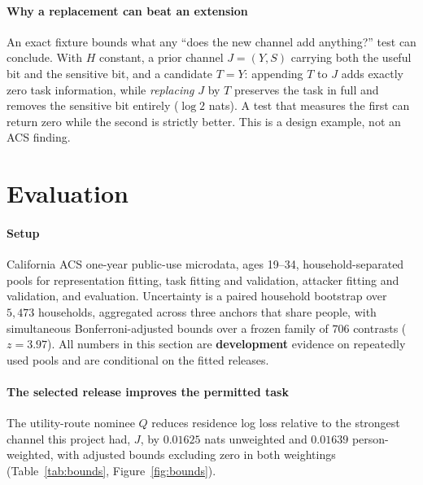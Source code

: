 \documentclass[conference]{IEEEtran}
\begin{document}
\paragraph{Why a replacement can beat an extension} An exact fixture bounds what any ``does the new
channel add anything?'' test can conclude. With $H$ constant, a prior channel $J=(Y,S)$ carrying both the
useful bit and the sensitive bit, and a candidate $T=Y$: appending $T$ to $J$ adds exactly zero task
information, while \emph{replacing} $J$ by $T$ preserves the task in full and removes the sensitive bit
entirely ($\log 2$ nats). A test that measures the first can return zero while the second is strictly
better. This is a design example, not an ACS finding.

\section{Evaluation}
\label{sec:eval}

\paragraph{Setup} California ACS one-year public-use microdata, ages 19--34, household-separated pools for
representation fitting, task fitting and validation, attacker fitting and validation, and evaluation.
Uncertainty is a paired household bootstrap over $5{,}473$ households, aggregated across three anchors that
share people, with simultaneous Bonferroni-adjusted bounds over a frozen family of $706$ contrasts
($z=3.97$). All numbers in this section are \textbf{development} evidence on repeatedly used pools and are
conditional on the fitted releases.

\paragraph{The selected release improves the permitted task} The utility-route nominee $Q$ reduces
residence log loss relative to the strongest channel this project had, $J$, by $0.01625$ nats unweighted
and $0.01639$ person-weighted, with adjusted bounds excluding zero in both weightings
(Table~\ref{tab:bounds}, Figure~\ref{fig:bounds}).

\begin{table}[t]
\centering\scriptsize
\caption{The selected release $Q$ against $J$: paired household bootstrap, simultaneous adjusted bounds
over the frozen family of $706$. The task improvement resolves; seven of the eight sensitive endpoints do
not. Development data.}
\label{tab:bounds}

\end{table}
\end{document}
